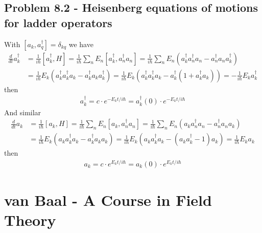 \documentclass[10pt,a4paper]{book}
\theoremstyle{definition}
\begin{document}
\subsection{Problem 8.2 - Heisenberg equations of motions for ladder operators}
With $[a_k,a_q^\dagger]=\delta_{kq}$ we have 
\begin{align}
\frac{d}{dt}a_k^\dagger
&=\frac{1}{i\hbar}[a_k^\dagger,H]
=\frac{1}{i\hbar}\sum_nE_n[a_k^\dagger,a_n^\dagger a_n]
=\frac{1}{i\hbar}\sum_nE_n(a_k^\dagger a_n^\dagger a_n-a_n^\dagger a_na_k^\dagger)\\
&=\frac{1}{i\hbar}E_k(a_k^\dagger a_k^\dagger a_k-a_k^\dagger a_ka_k^\dagger)
=\frac{1}{i\hbar}E_k(a_k^\dagger a_k^\dagger a_k-a_k^\dagger(1+a_k^\dagger a_k))
=-\frac{1}{i\hbar}E_k a^\dagger_k
\end{align}
then
\begin{align}
a^\dagger_k=c\cdot e^{-E_kt/i\hbar}=a^\dagger_k(0)\cdot e^{-E_kt/i\hbar}
\end{align}
And similar
\begin{align}
\frac{d}{dt}a_k
&=\frac{1}{i\hbar}[a_k,H]
=\frac{1}{i\hbar}\sum_nE_n[a_k,a_n^\dagger a_n]
=\frac{1}{i\hbar}\sum_nE_n(a_k a^\dagger_n a_n-a_n^\dagger a_na_k)\\
&=\frac{1}{i\hbar}E_k(a_k a_k^\dagger a_k-a_k^\dagger a_ka_k)
=\frac{1}{i\hbar}E_k(a_k a_k^\dagger a_k -(a_k a_k^\dagger-1)a_k)
=\frac{1}{i\hbar}E_k a_k
\end{align}
then
\begin{align}
a_k=c\cdot e^{E_kt/i\hbar}=a_k(0)\cdot e^{E_kt/i\hbar}
\end{align}


\section{{\sc van Baal} - A Course in Field Theory}
\end{document}
